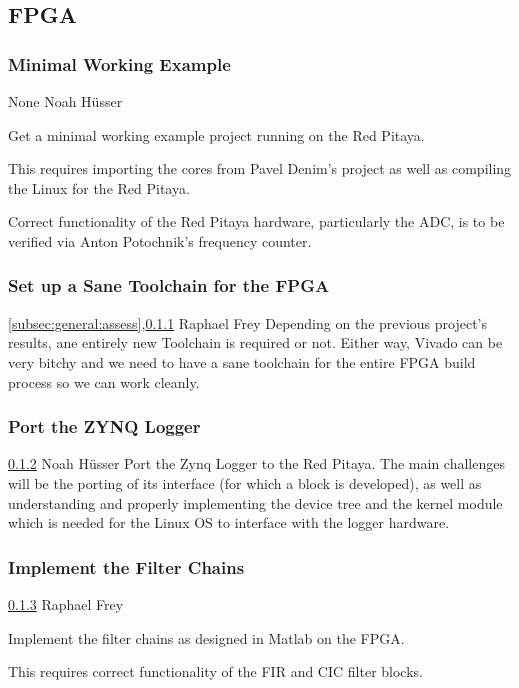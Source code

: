 \documentclass[a4paper,oneside]{alpenspecs/alpenspecs}
\begin{document}
\subsection{FPGA}
\label{subsec:fw:fpga}

\subsubsection{Minimal Working Example}
\label{subsubsec:fw:fpga:mwe}
\wpac
    {}
    {}
    {}
    {None}
    {}
    {Noah H\"usser}
    {%
        Get a minimal working example project running on the Red Pitaya.

        This requires importing the cores from Pavel Denim's project as
        well as compiling the Linux for the Red Pitaya.

        Correct functionality of the Red Pitaya hardware, particularly the
        ADC, is to be verified via Anton Potochnik's frequency counter.
    }

\subsubsection{Set up a Sane Toolchain for the FPGA}
\label{subsubsec:fw:fpga:sane}

\wpac
    {}
    {}
    {}
    {\ref{subsec:general:assess},\ref{subsubsec:fw:fpga:mwe}}
    {}
    {Raphael Frey}
    {%
        Depending on the previous project's results, ane entirely new Toolchain is required or not. Either way, Vivado can be very bitchy and we need to have a sane toolchain for the entire FPGA build process so we can work cleanly.
    }

\subsubsection{Port the ZYNQ Logger}
\label{subsubsec:fw:fpga:logger}
\wpac
    {}
    {}
    {}
    {\ref{subsubsec:fw:fpga:sane}}
    {}
    {Noah H\"usser}
    {%
        Port the Zynq Logger to the Red Pitaya. The main challenges will be
        the porting of its interface (for which a block 
        is developed), as well as understanding and properly implementing the
        device tree and the kernel module which is needed for the Linux OS
        to interface with the logger hardware.
    }

\subsubsection{Implement the Filter Chains}
\label{subsubsec:fw:fpga:filters}
\wpac
    {}
    {}
    {}
    {\ref{subsubsec:fw:fpga:logger}}
    {}
    {Raphael Frey}
    {%
        Implement the filter chains as designed in Matlab on the FPGA.

        This requires correct functionality of the FIR and CIC filter
        blocks.
    }
\end{document}
